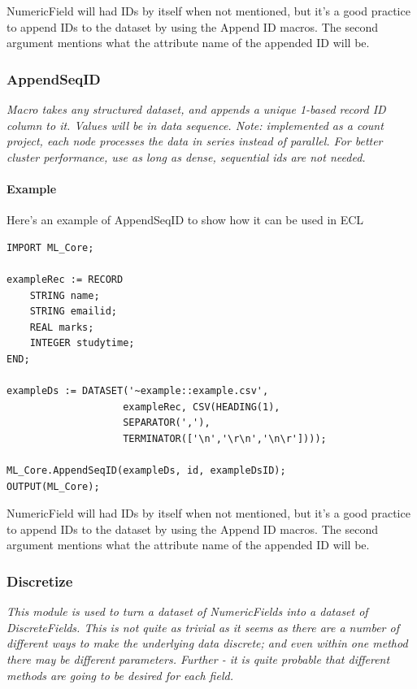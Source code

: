 \documentclass[a4paper,oneside,12pt]{book}
\begin{document}
NumericField will had IDs by itself when not mentioned, but it's a good practice to append IDs to the dataset by using the Append ID macros. The second argument mentions what the attribute name of the appended ID will be.

\subsubsection{AppendSeqID}\label{mlcore:appendseqid}

\textit{Macro takes any structured dataset, and appends a unique 1-based record ID column to it. Values will be in data sequence. Note: implemented as a count project, each node processes the data in series instead of parallel. For better cluster performance, use  as long as dense, sequential ids are not needed.}

\paragraph{Example}

Here's an example of AppendSeqID to show how it can be used in ECL

\begin{lstlisting}
IMPORT ML_Core;

exampleRec := RECORD
    STRING name;
    STRING emailid;
    REAL marks;
    INTEGER studytime;
END;

exampleDs := DATASET('~example::example.csv', 
                    exampleRec, CSV(HEADING(1),
                    SEPARATOR(','),
                    TERMINATOR(['\n','\r\n','\n\r'])));

ML_Core.AppendSeqID(exampleDs, id, exampleDsID);
OUTPUT(ML_Core);
\end{lstlisting}

NumericField will had IDs by itself when not mentioned, but it's a good practice to append IDs to the dataset by using the Append ID macros. The second argument mentions what the attribute name of the appended ID will be.

\subsubsection{Discretize}\label{mlcore:discretize}

\textit{This module is used to turn a dataset of NumericFields into a dataset of DiscreteFields. This is not quite as trivial as it seems as there are a number of different ways to make the underlying data discrete; and even within one method there may be different parameters. Further - it is quite probable that different methods are going to be desired for each field.}
\end{document}
